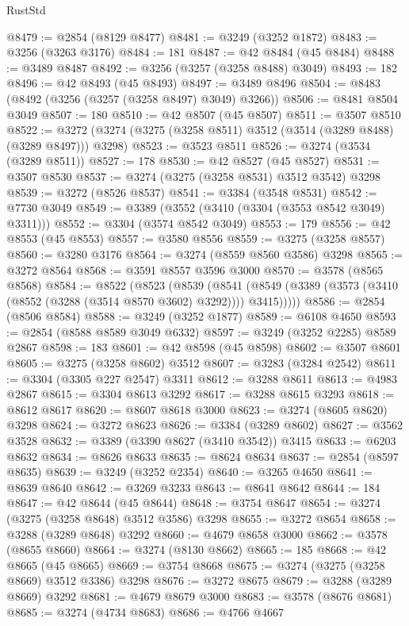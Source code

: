 \begin{lexlean}{RustStd}
\begin{coremodule}
@8479 := @2854 (@8129 @8477)
@8481 := @3249 (@3252 @1872)
@8483 := @3256 (@3263 @3176)
@8484 := 181
@8487 := @42 @8484 (@45 @8484)
@8488 := @3489 @8487
@8492 := @3256 (@3257 (@3258 @8488) @3049)
@8493 := 182
@8496 := @42 @8493 (@45 @8493)
@8497 := @3489 @8496
@8504 := @8483 (@8492 (@3256 (@3257 (@3258 @8497) @3049) @3266))
@8506 := @8481 @8504 @3049
@8507 := 180
@8510 := @42 @8507 (@45 @8507)
@8511 := @3507 @8510
@8522 := @3272 (@3274 (@3275 (@3258 @8511) @3512 (@3514 (@3289 @8488) (@3289 @8497))) @3298)
@8523 := @3523 @8511
@8526 := @3274 (@3534 (@3289 @8511))
@8527 := 178
@8530 := @42 @8527 (@45 @8527)
@8531 := @3507 @8530
@8537 := @3274 (@3275 (@3258 @8531) @3512 @3542) @3298
@8539 := @3272 (@8526 @8537)
@8541 := @3384 (@3548 @8531)
@8542 := @7730 @3049
@8549 := @3389 (@3552 (@3410 (@3304 (@3553 @8542 @3049) @3311)))
@8552 := @3304 (@3574 @8542 @3049)
@8553 := 179
@8556 := @42 @8553 (@45 @8553)
@8557 := @3580 @8556
@8559 := @3275 (@3258 @8557)
@8560 := @3280 @3176
@8564 := @3274 (@8559 @8560 @3586) @3298
@8565 := @3272 @8564
@8568 := @3591 @8557 @3596 @3000
@8570 := @3578 (@8565 @8568)
@8584 := @8522
    (@8523
      (@8539
        (@8541 (@8549 (@3389 (@3573 (@3410 (@8552 (@3288 (@3514 @8570 @3602) @3292)))) @3415)))))
@8586 := @2854 (@8506 @8584)
@8588 := @3249 (@3252 @1877)
@8589 := @6108 @4650
@8593 := @2854 (@8588 @8589 @3049 @6332)
@8597 := @3249 (@3252 @2285) @8589 @2867
@8598 := 183
@8601 := @42 @8598 (@45 @8598)
@8602 := @3507 @8601
@8605 := @3275 (@3258 @8602) @3512
@8607 := @3283 (@3284 @2542)
@8611 := @3304 (@3305 @227 @2547) @3311
@8612 := @3288 @8611
@8613 := @4983 @2867
@8615 := @3304 @8613 @3292
@8617 := @3288 @8615 @3293
@8618 := @8612 @8617
@8620 := @8607 @8618 @3000
@8623 := @3274 (@8605 @8620) @3298
@8624 := @3272 @8623
@8626 := @3384 (@3289 @8602)
@8627 := @3562 @3528
@8632 := @3389 (@3390 @8627 (@3410 @3542)) @3415
@8633 := @6203 @8632
@8634 := @8626 @8633
@8635 := @8624 @8634
@8637 := @2854 (@8597 @8635)
@8639 := @3249 (@3252 @2354)
@8640 := @3265 @4650
@8641 := @8639 @8640
@8642 := @3269 @3233
@8643 := @8641 @8642
@8644 := 184
@8647 := @42 @8644 (@45 @8644)
@8648 := @3754 @8647
@8654 := @3274 (@3275 (@3258 @8648) @3512 @3586) @3298
@8655 := @3272 @8654
@8658 := @3288 (@3289 @8648) @3292
@8660 := @4679 @8658 @3000
@8662 := @3578 (@8655 @8660)
@8664 := @3274 (@8130 @8662)
@8665 := 185
@8668 := @42 @8665 (@45 @8665)
@8669 := @3754 @8668
@8675 := @3274 (@3275 (@3258 @8669) @3512 @3386) @3298
@8676 := @3272 @8675
@8679 := @3288 (@3289 @8669) @3292
@8681 := @4679 @8679 @3000
@8683 := @3578 (@8676 @8681)
@8685 := @3274 (@4734 @8683)
@8686 := @4766 @4667

\end{coremodule}
\end{lexlean}
